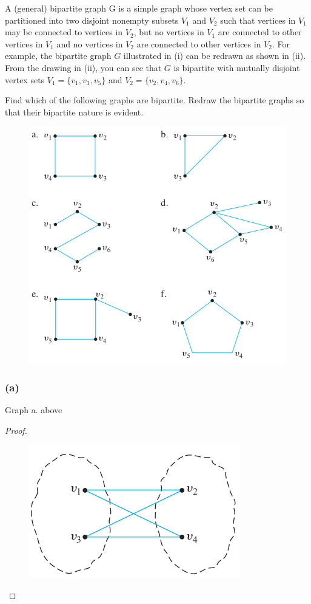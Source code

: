\documentclass[14pt]{extarticle}
\begin{document}
A (general) bipartite graph G is a simple graph whose vertex set can be partitioned into two disjoint nonempty subsets $V_1$ and $V_2$ such that vertices in $V_1$ may be connected to vertices in $V_2$, but no vertices in $V_1$ are connected to other vertices in $V_1$ and no vertices in $V_2$ are connected to other vertices in $V_2$. For example, the bipartite graph $G$ illustrated in (i) can be redrawn as shown in (ii). From the drawing in (ii), you can see that $G$ is bipartite with mutually disjoint vertex sets $V_1 = \{v_1, v_3, v_5\}$ and $V_2 = \{v_2, v_4, v_6\}$.

Find which of the following graphs are bipartite. Redraw the bipartite graphs so that their bipartite nature is evident.

\begin{figure}[ht!]
\centering
\includegraphics[scale=0.5]{../images/4.9.24.2.png}
\end{figure}

\subsubsection{(a)}
Graph a. above

\begin{proof}
\begin{figure}[ht!]
\centering
\includegraphics[scale=0.4]{../images/4.9.24.a.png}
\end{figure}
\end{proof}
\end{document}
